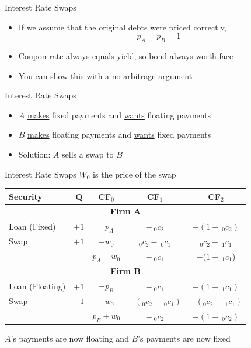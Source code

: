 \documentclass{beamer}
\begin{document}
\begin{frame}{Interest Rate Swaps}
    \begin{itemize}
        \item If we assume that the original debts were priced correctly, 
            \begin{equation}
                p_{A}=p_{B}=1
            \end{equation}
        \item Coupon rate always equals yield, so bond always worth face
        \item You can show this with a no-arbitrage argument
    \end{itemize}
\end{frame}

\begin{frame}{Interest Rate Swaps}
    \begin{itemize}
        \item $A$ \underline{makes} fixed payments and \underline{wants} floating payments
        \item $B$ \underline{makes} floating payments and \underline{wants} fixed payments
        \item Solution: $A$ sells a swap to $B$ 
    \end{itemize}
\end{frame}

\begin{frame}{Interest Rate Swaps}
    $W_{0}$ is the price of the swap
    \begin{center}
        \begin{tabular}{lcccc}
            Security & Q & CF$_{0}$ & CF$_{1}$ & CF$_{2}$\\ \hline
            \multicolumn{5}{c}{\textbf{Firm A}} \\ \hline
            Loan (Fixed) & $+1$ & $+p_{A}$ & $-\:_{0}c_{2}$ & $-(1+\:_{0}c_{2})$\\
            Swap & $+1$ & $-w_{0}$ & $_{0}c_{2}-\:_{0}c_{1}$ & $_{0}c_{2}-\:_{1}c_{1}$ \\ \hline
            & & $p_{A}-w_{0}$ & $-\:_{0}c_{1}$ & $-(1+\:_{1}c_{1}$) \\ \hline
            \multicolumn{5}{c}{\textbf{Firm B}} \\ \hline
            Loan (Floating) & $+1$ & $+p_{B}$ & $-\:_{0}c_{1}$ & $-(1+\:_{1}c_{1})$ \\
            Swap & $-1$ & $+w_{0}$ & $-(_{0}c_{2}-\:_{0}c_{1})$ & $-(_{0}c_{2}-\:_{1}c_{1})$ \\ \hline
            & & $p_{B}+w_{0}$ & $-\:_{0}c_{2}$ & $-(1+\:_{0}c_{2})$
        \end{tabular}
    \end{center}
    $A$'s payments are now floating and $B$'s payments are now fixed
\end{frame}
\end{document}
